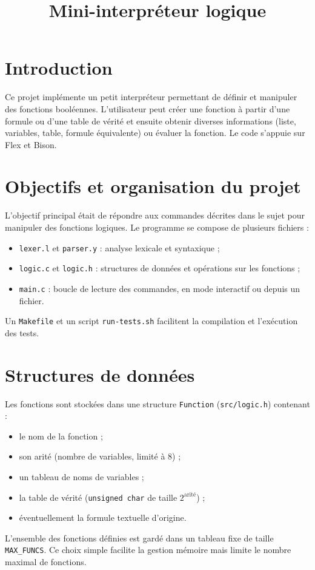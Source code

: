 \documentclass[11pt,a4paper]{article}
\title{Mini-interpréteur logique}
\date{}
\begin{document}
\maketitle
\section*{Introduction}
Ce projet implémente un petit interpréteur permettant de définir et manipuler des fonctions booléennes. L'utilisateur peut créer une fonction à partir d'une formule ou d'une table de vérité et ensuite obtenir diverses informations (liste, variables, table, formule équivalente) ou évaluer la fonction. Le code s'appuie sur Flex et Bison.

\section*{Objectifs et organisation du projet}
L'objectif principal était de répondre aux commandes décrites dans le sujet pour manipuler des fonctions logiques. Le programme se compose de plusieurs fichiers :
\begin{itemize}
  \item \texttt{lexer.l} et \texttt{parser.y} : analyse lexicale et syntaxique ;
  \item \texttt{logic.c} et \texttt{logic.h} : structures de données et opérations sur les fonctions ;
  \item \texttt{main.c} : boucle de lecture des commandes, en mode interactif ou depuis un fichier.
\end{itemize}
Un \texttt{Makefile} et un script \texttt{run-tests.sh} facilitent la compilation et l'exécution des tests.
\section*{Structures de données}
Les fonctions sont stockées dans une structure \texttt{Function} (\texttt{src/logic.h}) contenant :
\begin{itemize}
  \item le nom de la fonction ;
  \item son arité (nombre de variables, limité à 8) ;
  \item un tableau de noms de variables ;
  \item la table de vérité (\texttt{unsigned char} de taille $2^{\text{arité}}$) ;
  \item éventuellement la formule textuelle d'origine.
\end{itemize}
L'ensemble des fonctions définies est gardé dans un tableau fixe de taille \texttt{MAX\_FUNCS}. Ce choix simple facilite la gestion mémoire mais limite le nombre maximal de fonctions.
\end{document}
